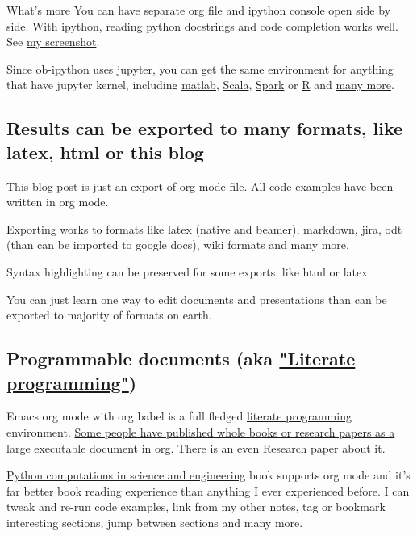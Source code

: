 \documentclass[11pt]{article}
\begin{document}
What's more You can have separate org file and ipython console open side by side.
With ipython, reading python docstrings and code completion works well. See \hyperref[sec:orgheadline2]{my screenshot}.

Since ob-ipython uses jupyter, you can get the same environment for anything that have jupyter kernel, including \href{https://github.com/calysto/matlab_kernel}{matlab}, \href{https://github.com/alexarchambault/jupyter-scala}{Scala}, \href{https://github.com/apache/incubator-toree}{Spark} or \href{http://irkernel.github.io/}{R} and \href{https://github.com/ipython/ipython/wiki/IPython-kernels-for-other-languages}{many more}.
\subsection{Results can be exported to many formats, like latex, html or this blog}
\label{sec:orgheadline4}
\href{https://github.com/kozikow/kozikow-blog/blob/master/ob_ipython/ipython.org}{This blog post is just an export of org mode file.} All code examples have been written in org mode.

Exporting works to formats like latex (native and beamer), markdown, jira, odt (than can be imported to google docs), wiki formats and many more.

Syntax highlighting can be preserved for some exports, like html or latex.

You can just learn one way to edit documents and presentations than can be exported to majority of formats on earth.
\subsection{Programmable documents (aka \href{https://en.wikipedia.org/wiki/Literate_programming}{"Literate programming"})}
\label{sec:orgheadline5}
Emacs org mode with org babel is a full fledged \href{https://en.wikipedia.org/wiki/Literate_programming}{literate programming} environment.
\href{http://kitchingroup.cheme.cmu.edu/blog/2014/08/08/What-we-are-using-org-mode-for/}{Some people have published whole books or research papers as a large executable document in org.} There is an even \href{http://dl.acm.org/citation.cfm?id=2723881}{Research paper about it}.

\href{https://github.com/jkitchin/pycse}{Python computations in science and engineering} book supports org mode and
it's far better book reading experience than anything I ever experienced before.
I can tweak and re-run code examples, link from my other notes, tag or bookmark interesting
sections, jump between sections and many more.
\end{document}

